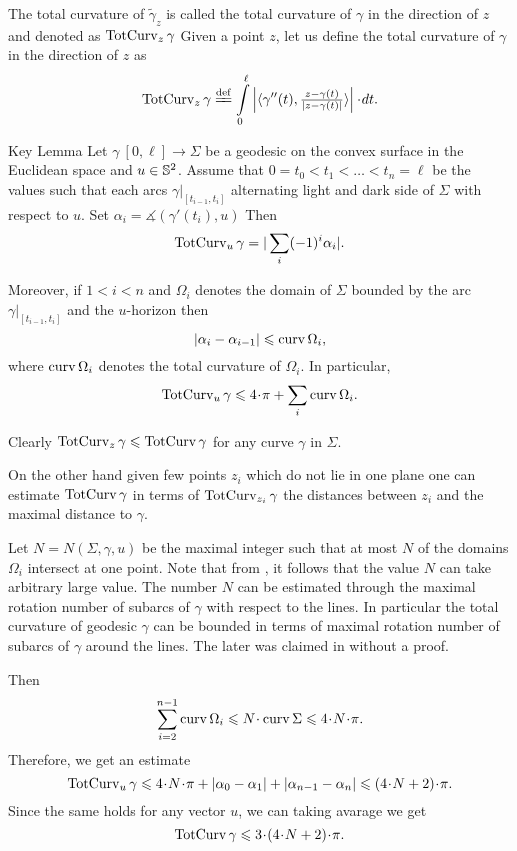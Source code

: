 \documentclass[a4paper,10pt]{amsart}
\begin{document}
The total curvature of $\tilde\gamma_z$ 
is called the total curvature of $\gamma$ in the direction of $z$ 
and denoted as $\mathop{\rm TotCurv}\nolimits_z\gamma$
Given a point $z$, let us define the total curvature of $\gamma$ in the direction of $z$ as
\[\tc_z\gamma
\df
\int\limits_0^\ell
\left|
\langle\gamma''(t),\tfrac{z-\gamma(t)}{|z-\gamma(t)|}\rangle
\right|
\cdot dt.\]

\begin{thm}{Key Lemma}
\label{lem:key}
Let $\gamma\:[0,\ell]\to \Sigma$ be a geodesic on the convex surface in the Euclidean space 
and $u\in\mathbb{S}^2$.
Assume that $0=t_0<t_1<\dots<t_n=\ell$ be the values such that each arcs $\gamma|_{[t_{i-1},t_i]}$ alternating light and dark side of $\Sigma$ with respect to $u$.
Set $\alpha_i=\measuredangle(\gamma'(t_i),u)$
Then 
\[\mathop{\rm TotCurv}\nolimits_u\gamma=|\sum_i(-1)^i\alpha_i|.\]

Moreover, if $1<i<n$ 
and $\Omega_i$ denotes the domain of $\Sigma$ bounded by the arc $\gamma|_{[t_{i-1},t_i]}$ and the $u$-horizon then 
\[|\alpha_i-\alpha_{i-1}|\leqslant \mathop{\rm curv}\nolimits\Omega_i,\]
where $\mathop{\rm curv}\nolimits\Omega_i$ denotes the total curvature of $\Omega_i$.
In particular,
\[\tc_u\gamma\le 4\cdot\pi+\sum_i\curv\Omega_i.\]
\end{thm}

Clearly $\mathop{\rm TotCurv}\nolimits_z\gamma\leqslant \mathop{\rm TotCurv}\nolimits \gamma$ for any curve $\gamma$ in $\Sigma$.

On the other hand given few points $z_i$ which do not lie in one plane
one can estimate $\mathop{\rm TotCurv}\nolimits\gamma$ 
in terms of $\mathop{\rm TotCurv}\nolimits_{z_i}\gamma$ 
the distances between $z_i$ and the maximal distance to $\gamma$.

Let $N=N(\Sigma,\gamma, u)$ be the maximal integer such that at most $N$ of the domains $\Omega_i$ intersect at one point.
Note that from \cite{BKZ}, it follows that the value $N$ can take arbitrary large value.
The number $N$ can be estimated through the maximal rotation number of subarcs of $\gamma$ with respect to the lines.
In particular the total curvature of geodesic $\gamma$ 
can be bounded in terms of maximal rotation number of subarcs of $\gamma$ around the lines.
The later was claimed in \cite{BKZ} without a proof.

Then
\[\sum_{i=2}^{n-1}\curv\Omega_i
\le 
N\cdot\curv\Sigma
\le 
4\cdot N\cdot\pi.\]
Therefore, we get an estimate
\[\tc_u\gamma
\le 
4\cdot N\cdot\pi+|\alpha_0-\alpha_1|+|\alpha_{n-1}-\alpha_n|
\le
(4\cdot N+2)\cdot\pi.\]
Since the same holds for any vector $u$,
we can taking avarage we get
\[\tc\gamma\le 3\cdot(4\cdot N+2)\cdot\pi.\]
\end{document}
